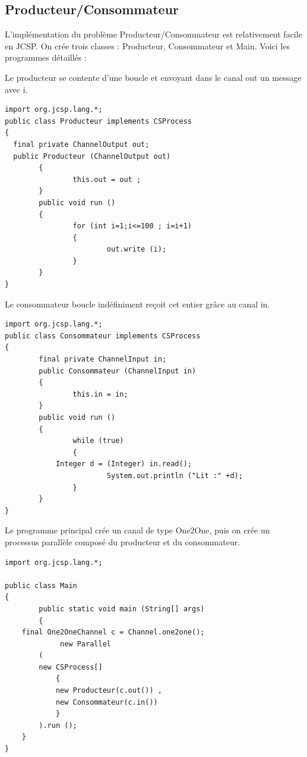 \documentclass[a4paper,11pt,french]{report}
\begin{document}
\subsection{Producteur/Consommateur}

L'implémentation du problème Producteur/Consommateur est relativement facile en JCSP. On crée trois classes : Producteur, Consommateur et Main. Voici les programmes détaillés :

Le producteur se contente d'une boucle et envoyant dans le canal out un message avec i. 

\begin{lstlisting}[frame=trBL,title={Producteurs-Consommateurs: Producteur.java}]
import org.jcsp.lang.*;
public class Producteur implements CSProcess
{
  final private ChannelOutput out;
  public Producteur (ChannelOutput out)
        {
                this.out = out ;
        }
        public void run ()
        {
                for (int i=1;i<=100 ; i=i+1)
                {
                        out.write (i);
                }
        }
}
\end{lstlisting}

Le consommateur boucle indéfiniment reçoit cet entier grâce au canal in.

\begin{lstlisting}[frame=trBL,title={Producteurs-Consommateurs: Consommateur.java}]
import org.jcsp.lang.*;
public class Consommateur implements CSProcess
{
        final private ChannelInput in;
        public Consommateur (ChannelInput in)
        {
                this.in = in;
        }
        public void run ()
        {
                while (true)
                {
			Integer d = (Integer) in.read();
                        System.out.println ("Lit :" +d);
                }
        }
}
\end{lstlisting}

Le programme principal crée un canal de type One2One, puis on crée un processus parallèle composé du producteur et du consommateur.

\begin{lstlisting}[frame=trBL,title={Producteurs-Consommateurs: Main.java}]
import org.jcsp.lang.*;

public class Main
{
        public static void main (String[] args)
        {
	final One2OneChannel c = Channel.one2one();
             new Parallel
		(
		new CSProcess[]
			{
			new Producteur(c.out()) ,
			new Consommateur(c.in())
			} 
		).run ();
	}
}
\end{lstlisting}
\end{document}
